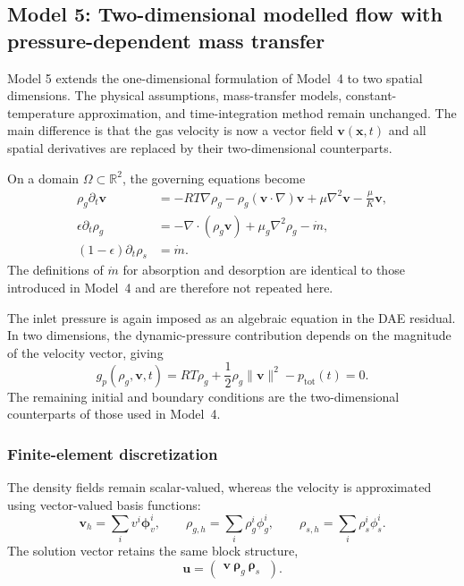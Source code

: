 \subsection{Model 5: Two-dimensional modelled flow with pressure-dependent mass transfer}
\label{subsec:model_5}

Model 5 extends the one-dimensional formulation of Model~4 to two spatial dimensions. The physical assumptions, mass-transfer models, constant-temperature approximation, and time-integration method remain unchanged. The main difference is that the gas velocity is now a vector field $\mathbf v(\mathbf x,t)$ and all spatial derivatives are replaced by their two-dimensional counterparts.

On a domain $\Omega\subset\mathbb R^2$, the governing equations become
\begin{subequations}\label{eq:model_5_governing_equations}
\begin{align}
\rho_g\partial_t\mathbf v
&=-RT\nabla\rho_g-\rho_g(\mathbf v\cdot\nabla)\mathbf v+\mu\nabla^2\mathbf v-\frac{\mu}{K}\mathbf v,\\
\epsilon\partial_t\rho_g
&=-\nabla\cdot(\rho_g\mathbf v)+\mu_g\nabla^2\rho_g-\dot m,\\
(1-\epsilon)\partial_t\rho_s
&=\dot m.
\end{align}
\end{subequations}
The definitions of $\dot m$ for absorption and desorption are identical to those introduced in Model~4 and are therefore not repeated here.

The inlet pressure is again imposed as an algebraic equation in the DAE residual. In two dimensions, the dynamic-pressure contribution depends on the magnitude of the velocity vector, giving
\begin{equation}\label{eq:model5_pressure_residual}
g_p(\rho_g,\mathbf v,t)
=RT\rho_g+\frac{1}{2}\rho_g\lVert\mathbf v\rVert^2-p_{\mathrm{tot}}(t)=0.
\end{equation}
The remaining initial and boundary conditions are the two-dimensional counterparts of those used in Model~4.

\subsubsection{Finite-element discretization}

The density fields remain scalar-valued, whereas the velocity is approximated using vector-valued basis functions:
\begin{equation}
\mathbf v_h=\sum_i v^i\boldsymbol\phi_v^i,\qquad
\rho_{g,h}=\sum_i\rho_g^i\phi_g^i,\qquad
\rho_{s,h}=\sum_i\rho_s^i\phi_s^i.
\end{equation}
The solution vector retains the same block structure,
\begin{equation}
\mathbf u=
\begin{pmatrix}
\mathbf v\
\boldsymbol\rho_g\
\boldsymbol\rho_s\
\end{pmatrix}.
\end{equation}

